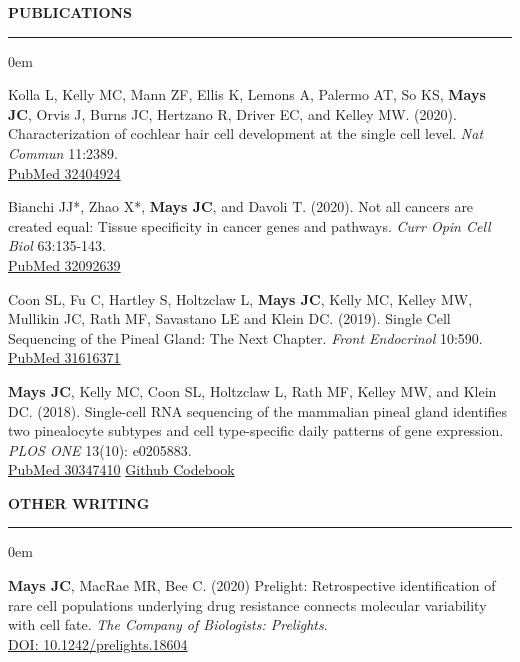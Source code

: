 \documentclass[10pt, letterpaper]{article} %
\newenvironment{CVSection}{
\begin{addmargin}[2em]{0em}
\begin{samepage}}
{\end{samepage}
\end{addmargin}\bigskip}
\newcommand{\CVHeading}[1]{
\MakeUppercase{\bf #1}
\smallskip
\hrule
\medskip
}
\begin{document}


\CVHeading{Publications}
\begin{CVSection}

Kolla L, Kelly MC, Mann ZF, Ellis K, Lemons A, Palermo AT, So KS, \textbf{Mays JC}, Orvis J, Burns JC, Hertzano R, Driver EC, and Kelley MW. (2020). Characterization of cochlear hair cell development at the single cell level. \emph{Nat Commun} 11:2389.\\
\hspace{2 in}\href{https://www.ncbi.nlm.nih.gov/pubmed/32404924}{\faFileTextO\hspace{1mm}PubMed 32404924}\medskip

Bianchi JJ*, Zhao X*, \textbf{Mays JC}, and Davoli T. (2020). Not all cancers are created equal: Tissue specificity in cancer genes and pathways. \emph{Curr Opin Cell Biol} 63:135-143.\\
\hspace{2 in}\href{https://www.ncbi.nlm.nih.gov/pubmed/32092639}{\faFileTextO\hspace{1mm}PubMed 32092639}\medskip

Coon SL, Fu C, Hartley S, Holtzclaw L, \textbf{Mays JC}, Kelly MC, Kelley MW, Mullikin JC, Rath MF, Savastano LE and Klein DC. (2019). Single Cell Sequencing of the Pineal Gland: The Next Chapter. \emph{Front Endocrinol} 10:590.\\
\hspace{2 in}\href{https://www.ncbi.nlm.nih.gov/pubmed/31616371}{\faFileTextO\hspace{1mm}PubMed 31616371}\medskip

\textbf{Mays JC}, Kelly MC, Coon SL, Holtzclaw L, Rath MF, Kelley MW, and Klein DC. (2018). Single-cell RNA sequencing of the mammalian pineal gland identifies two pinealocyte subtypes and cell type-specific daily patterns of gene expression. \emph{PLOS ONE} 13(10): e0205883.\\
\hspace{2 in}\href{https://www.ncbi.nlm.nih.gov/pubmed/30347410}{\faFileTextO\hspace{1mm}PubMed 30347410}
\hspace{2mm}\href{https://github.com/joeymays/PinealGland_SingleCell}{\faCode\hspace{1mm}Github Codebook}\medskip
\end{CVSection}

\CVHeading{Other Writing}
\begin{CVSection}
\textbf{Mays JC}, MacRae MR, Bee C. (2020) Prelight: Retrospective identification of rare cell populations underlying drug resistance connects molecular variability with cell fate. \emph{The Company of Biologists: Prelights}.\\
\href{https://doi.org/10.1242/prelights.18604}{DOI: 10.1242/prelights.18604}
\end{CVSection}
\end{document}
